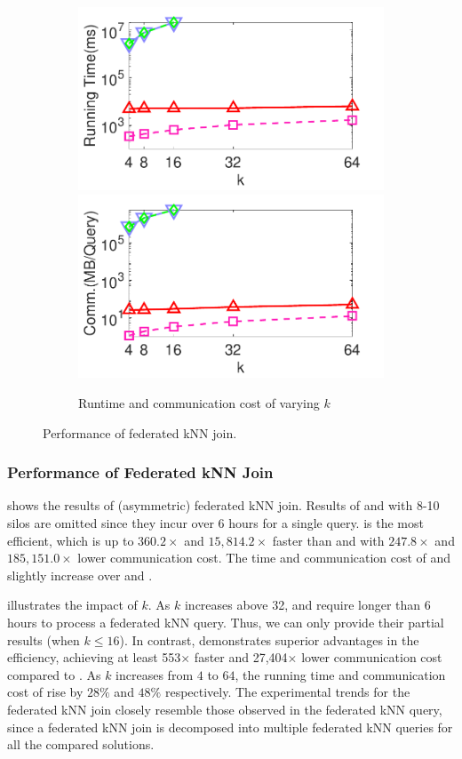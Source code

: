 \begin{figure}[t]
    \begin{subfigure}{0.48\textwidth}
        \includegraphics[width=0.48\linewidth]{knnjoin_k_time.pdf}
        \includegraphics[width=0.48\linewidth]{knnjoin_k_cost.pdf}
        \caption{Runtime and communication cost of varying $k$}
        \label{fig:knn-join-eff-k}
    \end{subfigure}
    \caption{Performance of federated kNN join.}
    \label{fig:knn-join-eff}
\end{figure}

\subsubsection{Performance of Federated kNN Join}
\label{sec:exp-asym-knnj}

 shows the results of (asymmetric) federated kNN join.
Results of \conclave and \conclaveext with $8$-10 silos are omitted since they incur over $6$ hours for a single query. 
\sysname is the most efficient, which is up to $360.2 \times$ and $15,814.2 \times$ faster than \smcql and \conclave with $247.8 \times$ and $185,151.0 \times$ lower communication cost.
The time and communication cost of \smcqlext and \conclaveext slightly increase over \smcql and \conclave.

 illustrates the impact of $k$.
As $k$ increases above 32, \conclave and \conclaveext require longer than 6 hours to process a federated kNN query.
Thus, we can only provide their partial results (when $k \le 16$).
In contrast, \sysname demonstrates superior advantages in the efficiency, achieving at least 553$\times$ faster and 27,404$\times$ lower communication cost compared to \conclave.
As $k$ increases from $4$ to $64$, the running time and communication cost of \sysname rise by $28\%$ and $48\%$ respectively.
The experimental trends for the federated kNN join closely resemble those observed in the federated kNN query,
since a federated kNN join is decomposed into multiple federated kNN queries for all the compared solutions.

